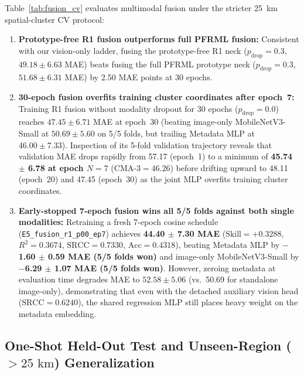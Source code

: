 \documentclass[conference]{IEEEtran}
\begin{document}
Table~\ref{tab:fusion_cv} evaluates multimodal fusion under the stricter 25~km
spatial-cluster CV protocol:
\begin{enumerate}
  \item \textbf{Prototype-free R1 fusion outperforms full PFRML fusion:}
        Consistent with our vision-only ladder, fusing the prototype-free R1
        neck ($p_{\text{drop}} = 0.3$, $49.18 \pm 6.63$ MAE) beats fusing the
        full PFRML prototype neck ($p_{\text{drop}} = 0.3$, $51.68 \pm 6.31$
        MAE) by 2.50 MAE points at 30 epochs.
  \item \textbf{30-epoch fusion overfits training cluster coordinates after
        epoch~7:} Training R1 fusion without modality dropout for 30 epochs
        ($p_{\text{drop}} = 0.0$) reaches $47.45 \pm 6.71$ MAE at epoch~30
        (beating image-only MobileNetV3-Small at $50.69 \pm 5.60$ on 5/5 folds,
        but trailing Metadata MLP at $46.00 \pm 7.33$). Inspection of its 5-fold
        validation trajectory reveals that validation MAE drops rapidly from
        57.17 (epoch~1) to a minimum of \textbf{45.74 $\pm$ 6.78 at epoch
        $N = 7$} ($\text{CMA-3} = 46.26$) before drifting upward to 48.11
        (epoch~20) and 47.45 (epoch~30) as the joint MLP overfits training
        cluster coordinates.
  \item \textbf{Early-stopped 7-epoch fusion wins all 5/5 folds against both
        single modalities:} Retraining a fresh 7-epoch cosine schedule
        (\texttt{E5\_fusion\_r1\_p00\_ep7}) achieves \textbf{44.40 $\pm$ 7.30
        MAE} ($\text{Skill} = +0.3288$, $R^2 = 0.3674$, $\text{SRCC} = 0.7330$,
        $\text{Acc} = 0.4318$), beating Metadata MLP by \textbf{$-$1.60 $\pm$
        0.59 MAE (5/5 folds won)} and image-only MobileNetV3-Small by
        \textbf{$-$6.29 $\pm$ 1.07 MAE (5/5 folds won)}. However, zeroing
        metadata at evaluation time degrades MAE to $52.58 \pm 5.06$ (vs.\ 50.69
        for standalone image-only), demonstrating that even with the detached
        auxiliary vision head ($\text{SRCC} = 0.6240$), the shared regression
        MLP still places heavy weight on the metadata embedding.
\end{enumerate}

\subsection{
  One-Shot Held-Out Test and Unseen-Region ($> 25\text{ km}$) Generalization
}
\label{subsec:results_final_test}
\end{document}
